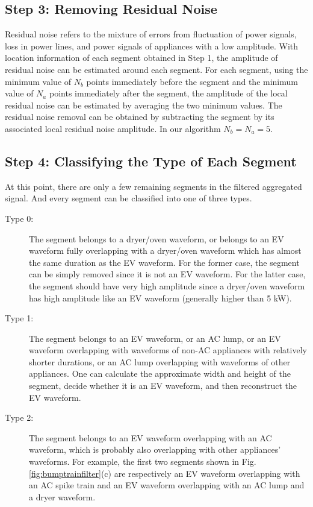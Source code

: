 \documentclass[conference]{IEEEtran}
\begin{document}
\subsection{Step 3: Removing Residual Noise}

Residual noise refers to the mixture of errors from fluctuation of power signals, loss in power lines, and power signals of appliances with a low amplitude. With location information of each segment obtained in Step 1, the amplitude of residual noise can be estimated around each segment. For each segment, using the minimum value of $N_b$ points immediately before the segment and the minimum value of $N_a$ points immediately after the segment, the amplitude of the local residual noise can be estimated by averaging the two minimum values.  The residual noise removal can be obtained by subtracting the segment by its associated local residual noise amplitude. In our algorithm $N_b = N_a = 5$.



\subsection{Step 4: Classifying the Type of Each Segment}

At this point, there are only a few remaining segments in the filtered aggregated signal. And every segment can be classified into one of three types.
\begin{description}
  \item[Type 0:] The segment belongs to a dryer/oven waveform, or belongs to an EV waveform fully overlapping with a dryer/oven waveform which has almost the same duration as the EV waveform. For the former case, the segment can be simply removed since it is not an EV waveform. For the latter case, the segment should have  very high amplitude since a dryer/oven waveform has  high amplitude like an EV waveform (generally higher than 5 kW).

  \item[Type 1:] The segment belongs to an EV waveform,  or an AC lump, or an EV waveform overlapping with waveforms of non-AC appliances with relatively shorter durations, or an AC lump overlapping with waveforms of other appliances. One can calculate the approximate width and height of the segment, decide whether it is an EV waveform,  and then reconstruct the EV waveform.

  \item[Type 2:] The segment belongs to an EV waveform overlapping with an AC waveform, which is probably also overlapping with other appliances' waveforms. For example, the first two segments shown in Fig.\ref{fig:bumptrainfilter}(c) are respectively an EV waveform overlapping with an AC spike train and an EV waveform overlapping with an AC lump and a dryer waveform.
\end{description}
\end{document}
